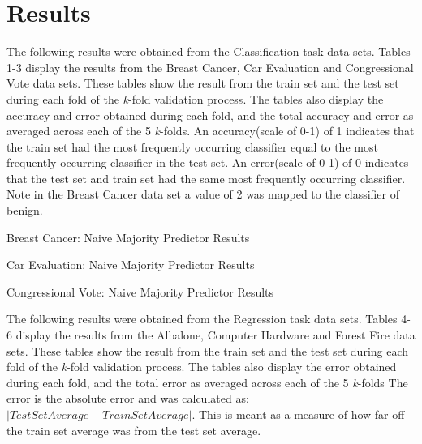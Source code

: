 \documentclass[twoside,11pt]{article}
\begin{document}
\newpage

\section{Results}
The following results were obtained from the Classification task data sets.
Tables 1-3 display the results from the Breast Cancer, Car Evaluation and Congressional Vote data sets. These tables show the result from the train set and the test set during each fold of the \textit{k}-fold validation process. The tables also display the accuracy and error obtained during each fold, and the total accuracy and error as averaged across each of the 5 \textit{k}-folds. An accuracy(scale of 0-1) of 1 indicates that the train set had the most frequently occurring classifier equal to the most frequently occurring classifier in the test set. An error(scale of 0-1) of 0 indicates that the test set and train set had the same most frequently occurring classifier. Note in the Breast Cancer data set a value of 2 was mapped to the classifier of benign.\\ 

\begin{table}[h!]
	\begin{center}
		\caption{Breast Cancer: Naive Majority Predictor Results}
		\label{tab:table1}
	\end{center}
\end{table}

\begin{table}[h!]
	\begin{center}
		\caption{Car Evaluation: Naive Majority Predictor Results}
		\label{tab:table2}
	\end{center}
\end{table}

\begin{table}[h!]
	\begin{center}
		\caption{Congressional Vote: Naive Majority Predictor Results}
		\label{tab:table3}
	\end{center}
\end{table}
\newpage

The following results were obtained from the Regression task data sets. Tables 4-6 display the results from the Albalone, Computer Hardware and Forest Fire data sets. These tables show the result from the train set and the test set during each fold of the \textit{k}-fold validation process.  The tables also display the error obtained during each fold, and the total error as averaged across each of the 5 \textit{k}-folds The error is the absolute error and was calculated as: $| Test Set Average - Train Set Average|$. This is meant as a measure of how far off the train set average was from the test set average. 
\end{document}
